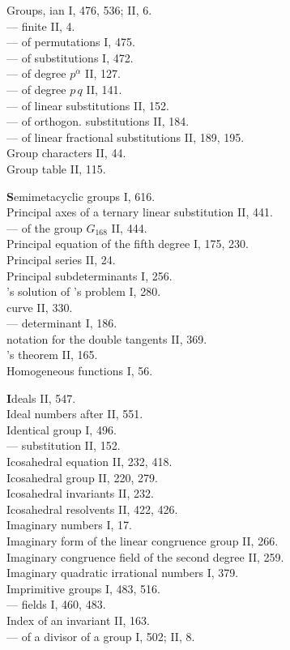 
\noindent
Groups, ian I, 476, 536; II, 6.\\
--- finite II, 4.\\
--- of permutations I, 475.\\
--- of substitutions I, 472.\\
--- of degree $p^{\alpha}$ II, 127.\\
--- of degree $p\,q$ II, 141.\\
--- of linear substitutions II, 152.\\
--- of orthogon. substitutions II, 184.\\
--- of linear fractional substitutions II, 189, 195.\\
Group characters II, 44.\\
Group table II, 115.

\medskip
\noindent
\textbf{S}emimetacyclic groups I, 616.\\
Principal axes of a ternary linear substitution II, 441.\\
--- of the group $G_{168}$ II, 444.\\
Principal equation of the fifth degree I, 175, 230.\\
Principal series II, 24.\\
Principal subdeterminants I, 256.\\
's solution of 's problem I, 280.\\
 curve II, 330.\\
--- determinant I, 186.\\
 notation for the double tangents II, 369.\\
's theorem II, 165.\\
Homogeneous functions I, 56.

\medskip
\noindent
\textbf{I}deals II, 547.\\
Ideal numbers after  II, 551.\\
Identical group I, 496.\\
--- substitution II, 152.\\
Icosahedral equation II, 232, 418.\\
Icosahedral group II, 220, 279.\\
Icosahedral invariants II, 232.\\
Icosahedral resolvents II, 422, 426.\\
Imaginary numbers I, 17.\\
Imaginary form of the linear congruence group II, 266.\\
Imaginary congruence field of the second degree II, 259.\\
Imaginary quadratic irrational numbers I, 379.\\
Imprimitive groups I, 483, 516.\\
--- fields I, 460, 483.\\
Index of an invariant II, 163.\\
--- of a divisor of a group I, 502; II, 8.

